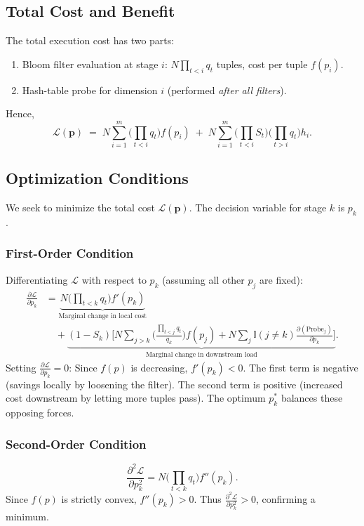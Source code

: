 \subsection{Total Cost and Benefit}
The total execution cost has two parts:
\begin{enumerate}
    \item Bloom filter evaluation at stage $i$: $N\!\prod_{t<i} q_t$ tuples, cost per tuple $f(p_i)$.
    \item Hash-table probe for dimension $i$ (performed \emph{after all filters}).
\end{enumerate}
Hence,
\[
\mathcal{L}(\mathbf{p}) \;=\;
N \sum_{i=1}^{m} \!\Big( \prod_{t<i} q_t \Big) f(p_i)
\;+\;
N \sum_{i=1}^{m} \!\Big( \prod_{t<i} S_t \Big)\!\Big( \prod_{t>i} q_t \Big) h_i.
\]

\subsection{Optimization Conditions}
We seek to minimize the total cost $\mathcal{L}(\mathbf{p})$. The decision variable for stage $k$ is $p_k$.

\subsubsection{First-Order Condition}
Differentiating $\mathcal{L}$ with respect to $p_k$ (assuming all other $p_{j}$ are fixed):
\[
\begin{split}
\frac{\partial \mathcal{L}}{\partial p_k} &= 
\underbrace{N \Big(\prod_{t<k} q_t\Big) f'(p_k)}_{\text{Marginal change in local cost}} \\
&\quad + \underbrace{(1-S_k) \Bigg[ 
    N \sum_{j>k} \Big( \frac{\prod_{t<j} q_t}{q_k} \Big) f(p_j) 
    + 
    N \sum_{j} \mathbb{I}(j \neq k) \frac{\partial (\text{Probe}_j)}{\partial p_k} 
\Bigg]}_{\text{Marginal change in downstream load}}.
\end{split}
\]
Setting $\frac{\partial \mathcal{L}}{\partial p_k} = 0$:
Since $f(p)$ is decreasing, $f'(p_k) < 0$. The first term is negative (savings locally by loosening the filter).
The second term is positive (increased cost downstream by letting more tuples pass).
The optimum $p_k^*$ balances these opposing forces.

\subsubsection{Second-Order Condition}
\[
\frac{\partial^2 \mathcal{L}}{\partial p_k^2} = N \Big(\prod_{t<k} q_t\Big) f''(p_k).
\]
Since $f(p)$ is strictly convex, $f''(p_k) > 0$. Thus $\frac{\partial^2 \mathcal{L}}{\partial p_k^2} > 0$, confirming a minimum.


